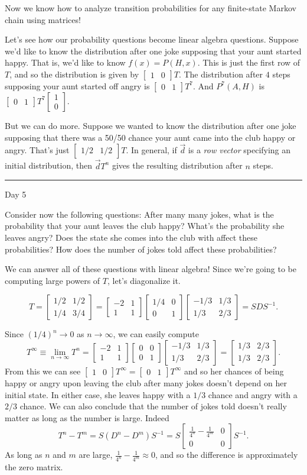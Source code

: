 \documentclass{problemset}
\newcommand{\mat}[1]{\begin{bmatrix}#1\end{bmatrix}}
\newcommand{\fatrule}[1]{\vspace{.3cm}\hrule {\hfill \sf #1}\par}
\begin{document}
	Now we know how to analyze transition probabilities for 
	any finite-state Markov chain using matrices!

	Let's see how our probability questions become linear algebra questions.  Suppose we'd like
	to know the distribution after one joke supposing that your aunt started happy.  That
	is, we'd like to know $f(x) = P(H,x)$.  This is just the first row of $T$, and so the distribution
	is given by $\mat{1&0}T$.  The distribution after $4$ steps supposing your aunt started off
	angry is $\mat{0&1}T^7$.  And $P^7(A,H)$ is $\mat{0&1}T^7\mat{1\\0}$.

	But we can do more.  Suppose we wanted to know the distribution after one joke supposing that
	there was a 50/50 chance your aunt came into the club happy or angry.  That's just 
	$\mat{1/2&1/2}T$.  In general, if $\vec d$ is a \emph{row vector} specifying an initial
	distribution, then $\vec dT^n$ gives the resulting distribution after $n$ steps.

	\fatrule{Day 5}

	Consider now the following questions: After many many jokes, what is the probability that your aunt
	leaves the club happy?  What's the probability she leaves angry?  Does the state she comes into the club
	with affect these probabilities?  How does the number of jokes told affect these probabilities?

	We can answer all of these questions with linear algebra!  Since we're going to be computing large
	powers of $T$, let's diagonalize it.

	\[
		T = \mat{1/2&1/2\\ 1/4 & 3/4} =
		\mat{-2& 1\\ 1& 1} \mat{1/4 & 0\\ 0& 1}\mat{-1/3 & 1/3 \\ 1/3& 2/3} = SDS^{-1}.
	\]

	Since $(1/4)^n\to 0$ as $n\to \infty$, we can easily compute
	\[
		T^\infty\equiv \lim_{n\to\infty} T^n = 
		\mat{-2& 1\\ 1& 1} \mat{0 & 0\\ 0& 1}\mat{-1/3 & 1/3 \\ 1/3& 2/3} = \mat{1/3&2/3\\1/3&2/3}.
	\]
	From this we can see $\mat{1 & 0}T^\infty = \mat{0&1}T^\infty$ and so her chances of being
	happy or angry upon leaving the club after many jokes doesn't depend on her initial state.  In
	either case, she leaves happy with a $1/3$ chance and angry with a $2/3$ chance.  We can also conclude
	that the number of jokes told doesn't really matter as long as the number is large.
	Indeed
	\[
		T^n-T^m = S(D^n-D^m)S^{-1} = S\mat{ \frac{1}{4^n}-\frac{1}{4^m} & 0 \\0 & 0}S^{-1}.
	\]
	As long as $n$ and $m$ are large, $\frac{1}{4^n}-\frac{1}{4^m}\approx 0$, and so the difference is
	approximately the zero matrix.
\end{document}
